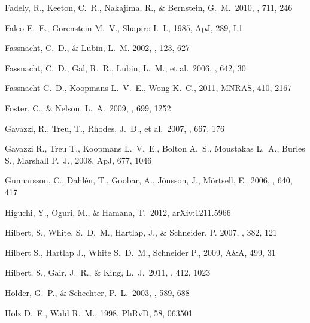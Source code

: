 \begin{thebibliography}{99}
 Fadely, R., Keeton, 
C.~R., Nakajima, R., \& Bernstein, G.~M.\ 2010, \apj, 711, 246 


 Falco E.~E., Gorenstein M.~V., Shapiro I.~I., 1985, ApJ, 289, L1 


{Fassnacht}, C.~D., \& {Lubin}, L.~M. 2002, \aj, 123, 627

 Fassnacht, C.~D., 
Gal, R.~R., Lubin, L.~M., et al.\ 2006, \apj, 642, 30 

 Fassnacht C.~D., Koopmans L.~V.~E., Wong K.~C., 2011, MNRAS, 410, 2167 

 Foster, C., \& Nelson, L.~A.\ 2009, \apj, 699, 1252 

 Gavazzi, R., Treu, T., 
Rhodes, J.~D., et al.\ 2007, \apj, 667, 176 

 Gavazzi R., Treu T., Koopmans L.~V.~E., 
Bolton A.~S., Moustakas L.~A., Burles S., Marshall P.~J., 2008, ApJ, 677, 
1046 

 Gunnarsson, C., 
Dahl{\'e}n, T., Goobar, A., J{\"o}nsson, J., M{\"o}rtsell, E.\ 2006, \apj, 640, 417 

 Higuchi, Y., Oguri, M., 
\& Hamana, T.\ 2012, arXiv:1211.5966 

{Hilbert}, S., {White}, S.~D.~M., {Hartlap}, J., \& {Schneider}, P. 2007,
  \mnras, 382, 121

 Hilbert S., Hartlap J., White S.~D.~M., Schneider P., 2009, A\&A, 499, 31 

 Hilbert, S., Gair, 
J.~R., \& King, L.~J.\ 2011, \mnras, 412, 1023 

 Holder, G.~P., \& Schechter, P.~L.\ 2003, \apj, 589, 688 


 Holz D.~E., Wald R.~M., 1998, PhRvD, 58, 063501 


\end{thebibliography}
